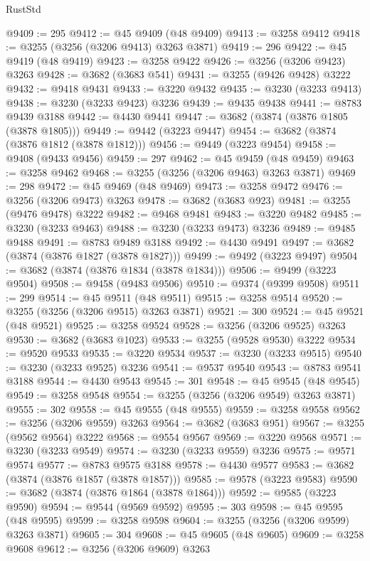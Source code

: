 \begin{lexlean}{RustStd}
\begin{coremodule}
{\begin{coremodule}
{{{{{{{{{{{{{{{{{{{{{{{{{{{{{{{{{{{{{@9409 := 295
@9412 := @45 @9409 (@48 @9409)
@9413 := @3258 @9412
@9418 := @3255 (@3256 (@3206 @9413) @3263 @3871)
@9419 := 296
@9422 := @45 @9419 (@48 @9419)
@9423 := @3258 @9422
@9426 := @3256 (@3206 @9423) @3263
@9428 := @3682 (@3683 @541)
@9431 := @3255 (@9426 @9428) @3222
@9432 := @9418 @9431
@9433 := @3220 @9432
@9435 := @3230 (@3233 @9413)
@9438 := @3230 (@3233 @9423) @3236
@9439 := @9435 @9438
@9441 := @8783 @9439 @3188
@9442 := @4430 @9441
@9447 := @3682 (@3874 (@3876 @1805 (@3878 @1805)))
@9449 := @9442 (@3223 @9447)
@9454 := @3682 (@3874 (@3876 @1812 (@3878 @1812)))
@9456 := @9449 (@3223 @9454)
@9458 := @9408 (@9433 @9456)
@9459 := 297
@9462 := @45 @9459 (@48 @9459)
@9463 := @3258 @9462
@9468 := @3255 (@3256 (@3206 @9463) @3263 @3871)
@9469 := 298
@9472 := @45 @9469 (@48 @9469)
@9473 := @3258 @9472
@9476 := @3256 (@3206 @9473) @3263
@9478 := @3682 (@3683 @923)
@9481 := @3255 (@9476 @9478) @3222
@9482 := @9468 @9481
@9483 := @3220 @9482
@9485 := @3230 (@3233 @9463)
@9488 := @3230 (@3233 @9473) @3236
@9489 := @9485 @9488
@9491 := @8783 @9489 @3188
@9492 := @4430 @9491
@9497 := @3682 (@3874 (@3876 @1827 (@3878 @1827)))
@9499 := @9492 (@3223 @9497)
@9504 := @3682 (@3874 (@3876 @1834 (@3878 @1834)))
@9506 := @9499 (@3223 @9504)
@9508 := @9458 (@9483 @9506)
@9510 := @9374 (@9399 @9508)
@9511 := 299
@9514 := @45 @9511 (@48 @9511)
@9515 := @3258 @9514
@9520 := @3255 (@3256 (@3206 @9515) @3263 @3871)
@9521 := 300
@9524 := @45 @9521 (@48 @9521)
@9525 := @3258 @9524
@9528 := @3256 (@3206 @9525) @3263
@9530 := @3682 (@3683 @1023)
@9533 := @3255 (@9528 @9530) @3222
@9534 := @9520 @9533
@9535 := @3220 @9534
@9537 := @3230 (@3233 @9515)
@9540 := @3230 (@3233 @9525) @3236
@9541 := @9537 @9540
@9543 := @8783 @9541 @3188
@9544 := @4430 @9543
@9545 := 301
@9548 := @45 @9545 (@48 @9545)
@9549 := @3258 @9548
@9554 := @3255 (@3256 (@3206 @9549) @3263 @3871)
@9555 := 302
@9558 := @45 @9555 (@48 @9555)
@9559 := @3258 @9558
@9562 := @3256 (@3206 @9559) @3263
@9564 := @3682 (@3683 @951)
@9567 := @3255 (@9562 @9564) @3222
@9568 := @9554 @9567
@9569 := @3220 @9568
@9571 := @3230 (@3233 @9549)
@9574 := @3230 (@3233 @9559) @3236
@9575 := @9571 @9574
@9577 := @8783 @9575 @3188
@9578 := @4430 @9577
@9583 := @3682 (@3874 (@3876 @1857 (@3878 @1857)))
@9585 := @9578 (@3223 @9583)
@9590 := @3682 (@3874 (@3876 @1864 (@3878 @1864)))
@9592 := @9585 (@3223 @9590)
@9594 := @9544 (@9569 @9592)
@9595 := 303
@9598 := @45 @9595 (@48 @9595)
@9599 := @3258 @9598
@9604 := @3255 (@3256 (@3206 @9599) @3263 @3871)
@9605 := 304
@9608 := @45 @9605 (@48 @9605)
@9609 := @3258 @9608
@9612 := @3256 (@3206 @9609) @3263
}}}}}}}}}}}}}}}}}}}}}}}}}}}}}}}}}}}}}
\end{coremodule}}
\end{coremodule}
\end{lexlean}
